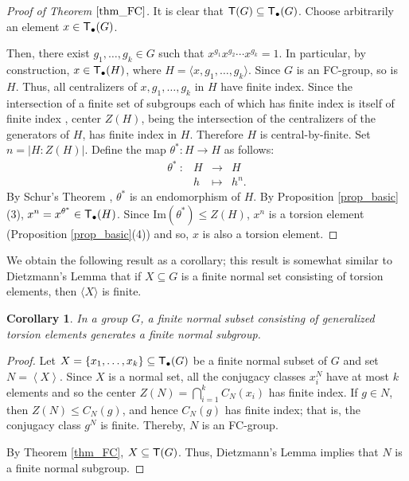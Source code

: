 \documentclass[12pt,leqno]{amsart}
\newcommand{\T}{{\sf T}}
\newcommand{\Tg}{{\sf T_{\bullet}}}
\newtheorem{cor}[theorem]{\sc Corollary}
\theoremstyle{definition}
\begin{document}
\begin{proof}[Proof of Theorem $\ref{thm_FC}$]
It is clear that $\T (G) \subseteq \Tg(G)$. Choose arbitrarily an element $x \in \Tg(G)$. 

Then, there exist $g_1, \ldots, g_k \in G$ such that $x^{g_1} x^{g_2} \cdots x^{g_k} =1$. In particular, by construction, $x \in \Tg(H)$, where $H = \langle x,g_1, \ldots, g_k \rangle$. Since $G$ is an FC-group, so is $H$. Thus, all centralizers of $x, 
 g_1,\ldots, g_k$ in $H$ have finite index. Since the intersection of a finite set of subgroups each of which has finite index is itself of finite index \cite[1.3.12]{Rob},  center $Z(H)$, being the intersection of the centralizers of the generators of $H$, has finite index in $H$. 
 Therefore $H$ is central-by-finite. Set $n = |H:Z(H)|$. 
Define the map $\theta^*:H\to H$ as follows:
$$\begin{array}{cccc}
\theta^{\ast} \ : & \! H & \! \longrightarrow
& \! H \\
& \! h & \! \longmapsto
& \! h^n.
\end{array}$$      
By Schur's Theorem \cite[10.1.3]{Rob},  $\theta^*$ is an endomorphism of $H$.
By Proposition \ref{prop_basic}(3), $x^n = x^{\theta^{\ast}} \in \Tg(H)$. Since  $\mbox{Im}(\theta^{\ast}) \leqslant Z(H)$,  $x^n$ is a torsion element (Proposition \ref{prop_basic}(4)) and so, $x$ is also a torsion element.
\end{proof}

We obtain the following result as a corollary; this result is somewhat similar to Dietzmann's Lemma \cite[14.5.7]{Rob} that if $X\subseteq G$ is a finite normal set consisting of torsion elements, then  $\langle X \rangle$ is finite.   


\begin{cor}
In a group $G$, a finite normal subset consisting of generalized torsion elements generates a finite normal subgroup.    
\end{cor}
\begin{proof} Let $X=\{ x_1,\ldots,x_k\} \subseteq \Tg(G)$  be a finite normal subset of $G$ and set $N=\left<X\right>$. Since $X$ is a normal set, 
all the conjugacy classes $x_i^N$ have at most $k$ elements and so the center $Z(N)=\bigcap_{i=1}^kC_N(x_i)$ has finite index.  
If $g\in N$, then $Z(N)\leq C_N(g)$, and hence $C_N(g)$ has finite index; that is, the conjugacy class $g^N$ is finite. Thereby, $N$ is an FC-group.

By Theorem \ref{thm_FC}, $X \subseteq \T (G)$. Thus, Dietzmann's Lemma implies that $N$ is a finite normal subgroup.  \end{proof}
\end{document}
